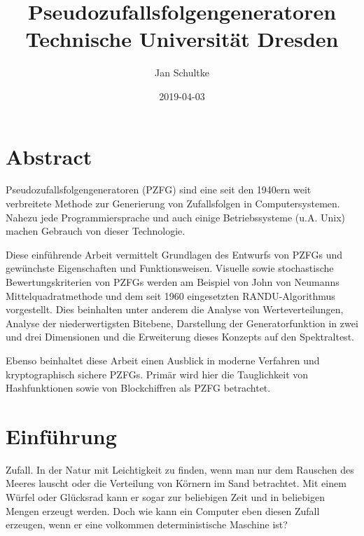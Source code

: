 \documentclass{article}
\title{\textbf{\LARGE Pseudozufallsfolgengeneratoren
\\{\large Technische Universit\"at Dresden}
}}
\author{\Large Jan Schultke}
\date{\large2019-04-03}
\begin{document}
    \maketitle
    \clearpage
    \pagebreak

    \tableofcontents
    \pagebreak

    \section{Abstract}\label{sec:abstract}
    Pseudozufallsfolgengeneratoren (PZFG) sind eine seit den 1940ern weit verbreitete Methode zur Generierung von
    Zufallsfolgen in Computersystemen.
    Nahezu jede Programmiersprache und auch einige Betriebssysteme (u.A. Unix) machen Gebrauch von dieser Technologie.

    \noindent\newline Diese einf\"uhrende Arbeit vermittelt Grundlagen des Entwurfs von PZFGs und gew\"unchste Eigenschaften und
    Funktionsweisen.
    Visuelle sowie stochastische Bewertungskriterien von PZFGs werden am Beispiel von John von Neumanns
    Mittelquadratmethode und dem seit 1960 eingesetzten RANDU-Algorithmus vorgestellt.
    Dies beinhalten unter anderem die Analyse von Werteverteilungen, Analyse der niederwertigsten Bitebene, Darstellung
    der Generatorfunktion in zwei und drei Dimensionen und die Erweiterung dieses Konzepts auf den Spektraltest.

    \noindent\newline Ebenso beinhaltet diese Arbeit einen Ausblick in moderne Verfahren und kryptographisch sichere PZFGs.
    Prim\"ar wird hier die Tauglichkeit von Hashfunktionen sowie von Blockchiffren als PZFG betrachtet.
    \pagebreak


    \section{Einf\"uhrung}\label{sec:intro}
    Zufall.
    In der Natur mit Leichtigkeit zu finden, wenn man nur dem Rauschen des Meeres lauscht oder die Verteilung von
    K\"ornern im Sand betrachtet.
    Mit einem W\"urfel oder Gl\"ucksrad kann er sogar zur beliebigen Zeit und in beliebigen Mengen erzeugt werden.
    Doch wie kann ein Computer eben diesen Zufall erzeugen, wenn er eine volkommen deterministische Maschine ist?
\end{document}
